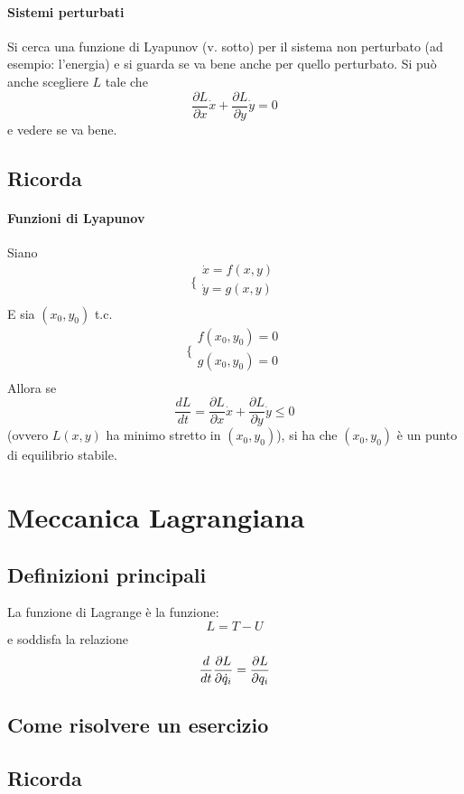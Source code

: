 \documentclass[a4paper,12pt]{article}
\begin{document}
\paragraph{Sistemi perturbati}
Si cerca una funzione di Lyapunov (v. sotto) per il sistema non perturbato (ad esempio: l'energia) e si guarda se va bene anche per quello perturbato. Si può anche scegliere $L$ tale che $$\dfrac{\partial L}{\partial x}\dot{x} + \dfrac{\partial L}{\partial y}\dot{y} = 0 $$ e vedere se va bene.

\subsection{Ricorda}

\paragraph{Funzioni di Lyapunov}
Siano
$$\bigg\{ \begin{array}{l}
\dot{x} = f(x,y)\\
\dot{y} = g(x,y)\\
\end{array}$$
E sia $(x_0, y_0)$ t.c.
$$\bigg\{ \begin{array}{l}
f(x_0,y_0) = 0\\
g(x_0,y_0) = 0\\
\end{array}$$
Allora se
$$ \dfrac{dL}{dt} = \dfrac{\partial L}{\partial x}\dot{x} + \dfrac{\partial L}{\partial y}\dot{y} \leq 0 $$
(ovvero $L(x, y)$ ha minimo stretto in $(x_0, y_0)$), si ha che $(x_0,y_0)$ è un punto di equilibrio stabile.


\section{Meccanica Lagrangiana}
\subsection{Definizioni principali}
La funzione di Lagrange è la funzione:
$$ L = T - U $$
e soddisfa la relazione
$${d \over dt}\dfrac{\partial L}{\partial\dot{q}_i} = \dfrac{\partial L}{\partial q_i}$$
\subsection{Come risolvere un esercizio}

\subsection{Ricorda}
\end{document}
